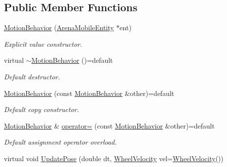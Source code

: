 \subsection*{Public Member Functions}
\begin{DoxyCompactItemize}
\item 
\mbox{\label{class_motion_behavior_aa2d5f7d563f4fdb5702edb8367eaa6e7}} 
\mbox{\hyperlink{class_motion_behavior_aa2d5f7d563f4fdb5702edb8367eaa6e7}{Motion\+Behavior}} (\mbox{\hyperlink{class_arena_mobile_entity}{Arena\+Mobile\+Entity}} $\ast$ent)
\begin{DoxyCompactList}\small\item\em Explicit value constructor. \end{DoxyCompactList}\item 
\mbox{\label{class_motion_behavior_a55f036f1b5c0b776656ebda7bad7ff17}} 
virtual \mbox{\hyperlink{class_motion_behavior_a55f036f1b5c0b776656ebda7bad7ff17}{$\sim$\+Motion\+Behavior}} ()=default
\begin{DoxyCompactList}\small\item\em Default destructor. \end{DoxyCompactList}\item 
\mbox{\label{class_motion_behavior_a5fe8e8a49e8cb34519a34ca652a23143}} 
\mbox{\hyperlink{class_motion_behavior_a5fe8e8a49e8cb34519a34ca652a23143}{Motion\+Behavior}} (const \mbox{\hyperlink{class_motion_behavior}{Motion\+Behavior}} \&other)=default
\begin{DoxyCompactList}\small\item\em Default copy constructor. \end{DoxyCompactList}\item 
\mbox{\label{class_motion_behavior_a227057c1862c64bbc609705205473abc}} 
\mbox{\hyperlink{class_motion_behavior}{Motion\+Behavior}} \& \mbox{\hyperlink{class_motion_behavior_a227057c1862c64bbc609705205473abc}{operator=}} (const \mbox{\hyperlink{class_motion_behavior}{Motion\+Behavior}} \&other)=default
\begin{DoxyCompactList}\small\item\em Default assignment operator overload. \end{DoxyCompactList}\item 
virtual void \mbox{\hyperlink{class_motion_behavior_a804f440bb7f03f19abec79a1ab671494}{Update\+Pose}} (double dt, \mbox{\hyperlink{struct_wheel_velocity}{Wheel\+Velocity}} vel=\mbox{\hyperlink{struct_wheel_velocity}{Wheel\+Velocity}}())

\end{DoxyCompactItemize}
